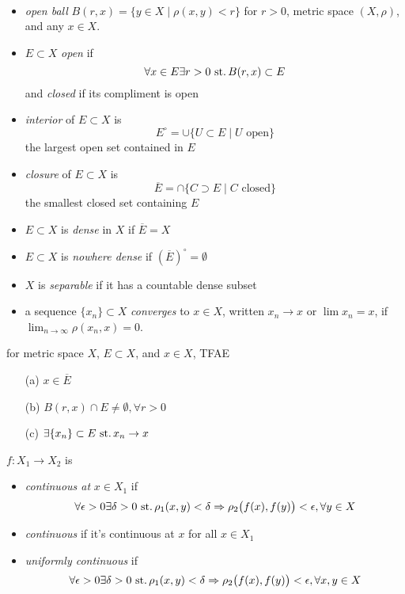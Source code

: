 \begin{defn}\
  \begin{itemize}
  \item \emph{open ball}
    ${B(r, x)=\{y\in X\mid \rho(x,y)<r\}}$ for ${r>0}$,
    metric space ${(X,\rho)}$, and any ${x\in X}$.
  \item ${E\subset X}$ \emph{open} if
    \[\forall x\in E\exists r>0\operatorname{\,st.} B(r,x)\subset E \]
    and \emph{closed} if its compliment is open
  \item \emph{interior} of ${E\subset X}$ is
    \[ E^\circ = \cup\{U\subset E\mid U\text{ open}\} \]
    the largest open set contained in $E$
  \item \emph{closure} of ${E\subset X}$ is
    \[ \overline E = \cap\{C\supset E\mid C\text{ closed}\} \]
    the smallest closed set containing $E$
  \item ${E\subset X}$ is \emph{dense} in $X$ if ${\overline E = X}$
  \item ${E\subset X}$ is \emph{nowhere dense} if
    ${{\left(\overline E\right)}^\circ = \emptyset}$
  \item $X$ is \emph{separable} if it has a countable dense subset
  \item a sequence ${\{x_n\}\subset X}$ \emph{converges} to
    ${x\in X}$, written ${x_n\rightarrow x}$ or
    ${\lim x_n = x}$, if
    ${\lim_{n\rightarrow\infty} \rho(x_n, x) = 0}$.
  \end{itemize}
\end{defn}

\begin{prop}\label{prop:0.22}\label{prop:00:closure-char}
  for metric space $X$, ${E\subset X}$, and ${x\in X}$, TFAE
  \begin{itemize}
  \item[(a)] ${x\in\overline E}$
  \item[(b)] ${B(r,x)\cap E\neq\emptyset,\forall r>0}$
  \item[(c)] ${\exists\{x_n\}\subset E\operatorname{\,st.} x_n\rightarrow x}$
  \end{itemize}
\end{prop}

\begin{defn}
  ${f: X_1\rightarrow X_2}$ is
  \begin{itemize}
  \item \emph{continuous at} ${x\in X_1}$ if
    \[
    \forall\epsilon>0\exists\delta>0\operatorname{\,st.}
    \rho_1(x,y)<\delta\Rightarrow\rho_2\big(f(x),f(y)\big)<\epsilon,
    \forall y\in X
    \]
  \item \emph{continuous} if it's continuous at $x$ for all ${x\in X_1}$
  \item \emph{uniformly continuous} if
    \[
    \forall\epsilon>0\exists\delta>0\operatorname{\,st.}
    \rho_1(x,y)<\delta\Rightarrow\rho_2\big(f(x),f(y)\big)<\epsilon,
    \forall x, y\in X
    \]
  \end{itemize}
\end{defn}

